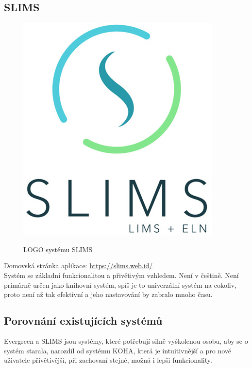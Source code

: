\subsection{SLIMS}
\begin{figure}
	\includegraphics[width=\linewidth]{img/Slims_Logo.png}\\
	\caption[LOGO systému SLIMS ze stránky \url{https://slims.web.id/}]{LOGO systému SLIMS}
\end{figure}
Domovská stránka aplikace: \url{https://slims.web.id/}\\
Systém se základní funkcionalitou a přivětivým vzhledem.
Není v češtině. Není primárně určen jako knihovní systém, spíš je to univerzální
systém na cokoliv, proto není až tak efektivní a jeho nastavování
by zabralo mnoho času.

\subsection{Porovnání existujících systémů}
Evergreen a SLIMS jsou systémy, které potřebují silně vyškolenou osobu,
aby se o systém starala, narozdíl od systému KOHA, která je intuitivnější a
pro nové uživatele přívětivější, při zachovaní stejné, možná i lepši funkcionality.\\
